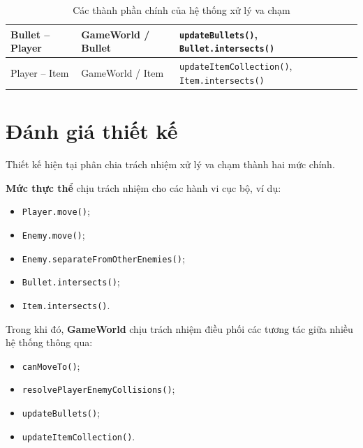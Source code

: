 \documentclass[12pt,a4paper]{report}
\begin{document}
\begin{table}[htbp]
\begin{tabular}{|p{3.2cm}|p{3.2cm}|p{6.5cm}|}
            Bullet -- Player
            &
            GameWorld / Bullet
            &
            \texttt{updateBullets()},
            \texttt{Bullet.intersects()}
            \\
            \hline

            Player -- Item
            &
            GameWorld / Item
            &
            \texttt{updateItemCollection()},
            \texttt{Item.intersects()}
            \\
            \hline

        \end{tabular}
        \caption{Các thành phần chính của hệ thống xử lý va chạm}
        \label{tab:collision-methods}
    \end{table}




    \section{Đánh giá thiết kế}

    Thiết kế hiện tại phân chia trách nhiệm xử lý va chạm thành hai
    mức chính.

    \textbf{Mức thực thể} chịu trách nhiệm cho các hành vi cục bộ,
    ví dụ:

    \begin{itemize}
        \item \texttt{Player.move()};
        \item \texttt{Enemy.move()};
        \item \texttt{Enemy.separateFromOtherEnemies()};
        \item \texttt{Bullet.intersects()};
        \item \texttt{Item.intersects()}.
    \end{itemize}

    Trong khi đó, \textbf{GameWorld} chịu trách nhiệm điều phối các
    tương tác giữa nhiều hệ thống thông qua:

    \begin{itemize}
        \item \texttt{canMoveTo()};
        \item \texttt{resolvePlayerEnemyCollisions()};
        \item \texttt{updateBullets()};
        \item \texttt{updateItemCollection()}.
    \end{itemize}
\end{document}
